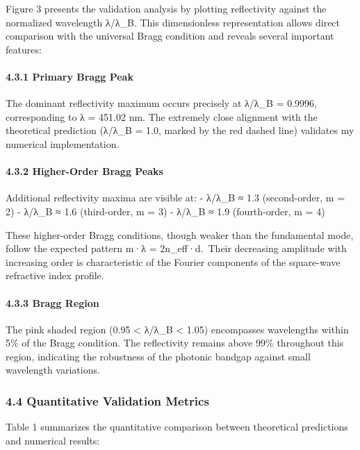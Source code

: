 \documentclass[
]{article}
\begin{document}
Figure 3 presents the validation analysis by plotting reflectivity
against the normalized wavelength λ/λ\_B. This dimensionless
representation allows direct comparison with the universal Bragg
condition and reveals several important features:

\paragraph{4.3.1 Primary Bragg Peak}\label{primary-bragg-peak}

The dominant reflectivity maximum occurs precisely at λ/λ\_B = 0.9996,
corresponding to λ = 451.02 nm. The extremely close alignment with the
theoretical prediction (λ/λ\_B = 1.0, marked by the red dashed line)
validates my numerical implementation.

\paragraph{4.3.2 Higher-Order Bragg
Peaks}\label{higher-order-bragg-peaks}

Additional reflectivity maxima are visible at: - λ/λ\_B ≈ 1.3
(second-order, m = 2) - λ/λ\_B ≈ 1.6 (third-order, m = 3) - λ/λ\_B ≈ 1.9
(fourth-order, m = 4)

These higher-order Bragg conditions, though weaker than the fundamental
mode, follow the expected pattern m·λ = 2n\_eff·d.~Their decreasing
amplitude with increasing order is characteristic of the Fourier
components of the square-wave refractive index profile.

\paragraph{4.3.3 Bragg Region}\label{bragg-region}

The pink shaded region (0.95 \textless{} λ/λ\_B \textless{} 1.05)
encompasses wavelengths within 5\% of the Bragg condition. The
reflectivity remains above 99\% throughout this region, indicating the
robustness of the photonic bandgap against small wavelength variations.

\subsubsection{4.4 Quantitative Validation
Metrics}\label{quantitative-validation-metrics}

Table 1 summarizes the quantitative comparison between theoretical
predictions and numerical results:
\end{document}
